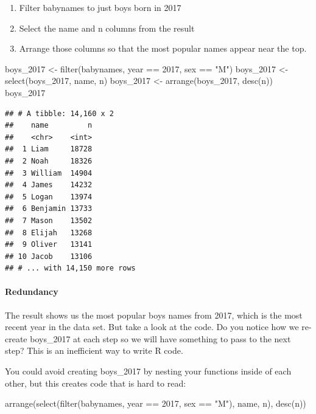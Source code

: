 \documentclass[
]{article}
\newenvironment{Shaded}{\begin{snugshade}}{\end{snugshade}}
\newcommand{\DecValTok}[1]{\textcolor[rgb]{0.00,0.00,0.81}{#1}}
\newcommand{\FunctionTok}[1]{\textcolor[rgb]{0.00,0.00,0.00}{#1}}
\newcommand{\NormalTok}[1]{#1}
\newcommand{\OtherTok}[1]{\textcolor[rgb]{0.56,0.35,0.01}{#1}}
\newcommand{\SpecialCharTok}[1]{\textcolor[rgb]{0.00,0.00,0.00}{#1}}
\newcommand{\StringTok}[1]{\textcolor[rgb]{0.31,0.60,0.02}{#1}}
\providecommand{\tightlist}{%
  \setlength{\itemsep}{0pt}\setlength{\parskip}{0pt}}
\begin{document}
\begin{enumerate}
\def\labelenumi{\arabic{enumi}.}
\tightlist
\item
  Filter babynames to just boys born in 2017
\item
  Select the name and n columns from the result
\item
  Arrange those columns so that the most popular names appear near the
  top.
\end{enumerate}

\begin{Shaded}
\begin{Highlighting}[]
\NormalTok{boys\_2017 }\OtherTok{\textless{}{-}} \FunctionTok{filter}\NormalTok{(babynames, year }\SpecialCharTok{==} \DecValTok{2017}\NormalTok{, sex }\SpecialCharTok{==} \StringTok{"M"}\NormalTok{)}
\NormalTok{boys\_2017 }\OtherTok{\textless{}{-}} \FunctionTok{select}\NormalTok{(boys\_2017, name, n)}
\NormalTok{boys\_2017 }\OtherTok{\textless{}{-}} \FunctionTok{arrange}\NormalTok{(boys\_2017, }\FunctionTok{desc}\NormalTok{(n))}
\NormalTok{boys\_2017}
\end{Highlighting}
\end{Shaded}

\begin{verbatim}
## # A tibble: 14,160 x 2
##    name         n
##    <chr>    <int>
##  1 Liam     18728
##  2 Noah     18326
##  3 William  14904
##  4 James    14232
##  5 Logan    13974
##  6 Benjamin 13733
##  7 Mason    13502
##  8 Elijah   13268
##  9 Oliver   13141
## 10 Jacob    13106
## # ... with 14,150 more rows
\end{verbatim}

\hypertarget{redundancy}{%
\paragraph{Redundancy}\label{redundancy}}

The result shows us the most popular boys names from 2017, which is the
most recent year in the data set. But take a look at the code. Do you
notice how we re-create boys\_2017 at each step so we will have
something to pass to the next step? This is an inefficient way to write
R code.

You could avoid creating boys\_2017 by nesting your functions inside of
each other, but this creates code that is hard to read:

\begin{Shaded}
\begin{Highlighting}[]
\FunctionTok{arrange}\NormalTok{(}\FunctionTok{select}\NormalTok{(}\FunctionTok{filter}\NormalTok{(babynames, year }\SpecialCharTok{==} \DecValTok{2017}\NormalTok{, sex }\SpecialCharTok{==} \StringTok{"M"}\NormalTok{), name, n), }\FunctionTok{desc}\NormalTok{(n))}
\end{Highlighting}
\end{Shaded}
\end{document}
